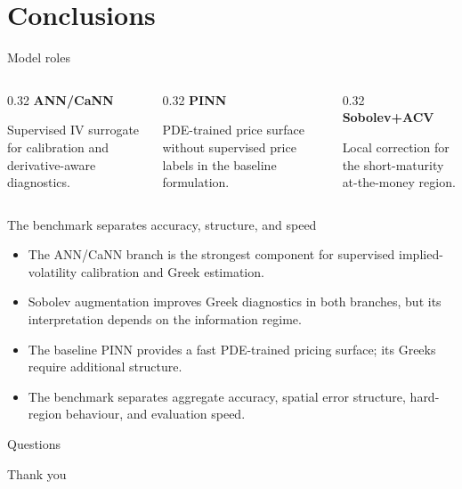 \section{Conclusions}

\begin{frame}{Model roles}
  \centering

  \vspace{4mm}
  \begin{columns}[T,onlytextwidth]
    \begin{column}{0.32\textwidth}
      \textbf{ANN/CaNN}

      \smallskip
      Supervised IV surrogate for calibration and derivative-aware diagnostics.
    \end{column}
    \begin{column}{0.32\textwidth}
      \textbf{PINN}

      \smallskip
      PDE-trained price surface without supervised price labels in the baseline formulation.
    \end{column}
    \begin{column}{0.32\textwidth}
      \textbf{Sobolev+ACV}

      \smallskip
      Local correction for the short-maturity at-the-money region.
    \end{column}
  \end{columns}
\end{frame}

\begin{frame}{The benchmark separates accuracy, structure, and speed}
  \begin{itemize}
    \item The ANN/CaNN branch is the strongest component for supervised implied-volatility calibration and Greek estimation.
    \item Sobolev augmentation improves Greek diagnostics in both branches, but its interpretation depends on the information regime.
    \item The baseline PINN provides a fast PDE-trained pricing surface; its Greeks require additional structure.
    \item The benchmark separates aggregate accuracy, spatial error structure, hard-region behaviour, and evaluation speed.
  \end{itemize}
\end{frame}

\begin{frame}[plain]
  \centering
  \vfill
  {\Huge Questions}

  \vspace{8mm}
  {\large Thank you}
  \vfill
\end{frame}
